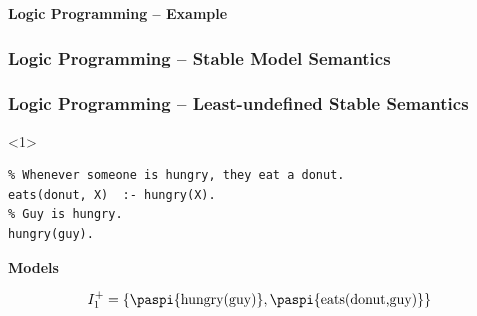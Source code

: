 \documentclass[aspectratio=169]{beamer}
\begin{document}

\begin{frame}[fragile]{\textbf{Logic Programming -- Example}}
\frametitle<2,3>{\textbf{Logic Programming -- Stable Model Semantics}}
\frametitle<4>{\textbf{Logic Programming -- Least-undefined Stable Semantics}}

\begin{minipage}{0.5\textwidth}
\begin{onlyenv}<1>
  \begin{verbatim}
% Whenever someone is hungry, they eat a donut.
eats(donut, X)  :- hungry(X).
% Guy is hungry.
hungry(guy).
  \end{verbatim}

  \vspace{0.5cm}

  {\centering\textcolor{palette-blue}{\bfseries Models}}

  \begin{equation*}
    I_1^+=\{\text{\paspi{hungry(guy)}},\text{\paspi{eats(donut,guy)}}\}
  \end{equation*}


\end{onlyenv}
\end{minipage}
\end{frame}
\end{document}

